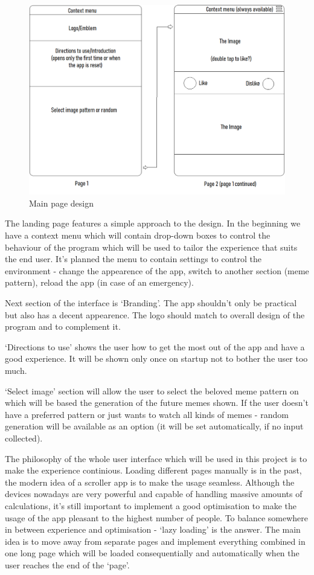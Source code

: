 \documentclass[12pt]{report}
\begin{document}
    \begin{figure}[h]
        \centerline{\includegraphics[scale=.5]{img/system_ui.png}}
        \label{system_ui}
        \caption{Main page design}
    \end{figure}

    The landing page features a simple approach to the design. In the beginning we have a context menu which will contain drop-down boxes to control the behaviour of the program which will be used to tailor the experience that suits the end user. It's planned the menu to contain settings to control the environment - change
    the appearence of the app, switch to another section (meme pattern), reload the app (in case of an emergency). 

    Next section of the interface is `Branding'. The app shouldn't only be practical but also has a decent appearence. The logo should match to overall design of the program and to complement it.

    `Directions to use' shows the user how to get the most out of the app and have a good experience. It will be shown only once on startup not to bother the user too much.

    `Select image' section will allow the user to select the beloved meme pattern on which will be based the generation of the future memes shown. If the user doesn't have a preferred pattern or just wants to watch all kinds of memes - random generation will be available as an option (it will be set automatically, if no input collected).

    The philosophy of the whole user interface which will be used in this project is to make the experience continious. Loading different pages manually is in the past, the modern idea of a scroller app is to make the usage seamless. Although the devices nowadays are very powerful and capable of handling massive amounts of calculations, it's still
    important to implement a good optimisation to make the usage of the app pleasant to the highest number of people. To balance somewhere in between experience and optimisation - `lazy loading' is the answer. The main idea is to move away from separate pages and implement everything combined in one long page which will be loaded consequentially and automatically when the user reaches the end of the `page'.
\end{document}
